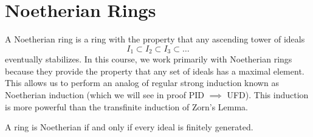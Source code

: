 \section{Noetherian Rings}
A Noetherian ring is a ring with the property that any ascending tower of ideals
\[
    I_1 \subset I_2 \subset I_3 \subset \dots
\]
eventually stabilizes. In this course, we work primarily with Noetherian rings because they provide the property that any set of ideals has a maximal element. This allows us to perform an analog of regular strong induction known as Noetherian induction (which we will see in proof PID $\implies$ UFD). This induction is more powerful than the transfinite induction of Zorn's Lemma.

A ring is Noetherian if and only if every ideal is finitely generated.

